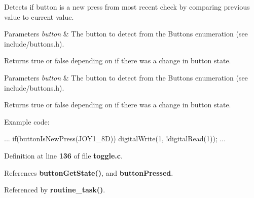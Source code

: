 Detects if button is a new press from most recent check by comparing previous value to current value. 


\begin{DoxyParams}{Parameters}
{\em button} & The button to detect from the Buttons enumeration (see include/buttons.\+h).\\
\hline
\end{DoxyParams}
\begin{DoxyReturn}{Returns}
true or false depending on if there was a change in button state.
\end{DoxyReturn}

\begin{DoxyParams}{Parameters}
{\em button} & The button to detect from the Buttons enumeration (see include/buttons.\+h).\\
\hline
\end{DoxyParams}
\begin{DoxyReturn}{Returns}
true or false depending on if there was a change in button state.
\end{DoxyReturn}
Example code\+: 
\begin{DoxyCode}
...
if(buttonIsNewPress(JOY1_8D))
    digitalWrite(1, !digitalRead(1));
...
\end{DoxyCode}
 

Definition at line \textbf{ 136} of file \textbf{ toggle.\+c}.



References \textbf{ button\+Get\+State()}, and \textbf{ button\+Pressed}.



Referenced by \textbf{ routine\+\_\+task()}.

